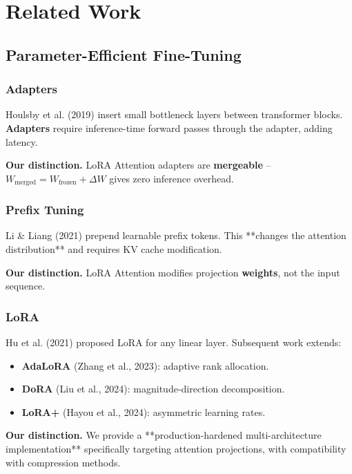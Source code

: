 \section{Related Work}

\subsection{Parameter-Efficient Fine-Tuning}

\subsubsection{Adapters}

Houlsby et al. (2019) insert small bottleneck layers between transformer 
blocks. \textbf{Adapters} require inference-time forward passes through the 
adapter, adding latency.

\textbf{Our distinction.} LoRA Attention adapters are \textbf{mergeable} -- 
$W_\text{merged} = W_\text{frozen} + \Delta W$ gives zero inference 
overhead.

\subsubsection{Prefix Tuning}

Li \& Liang (2021) prepend learnable prefix tokens. This **changes the 
attention distribution** and requires KV cache modification.

\textbf{Our distinction.} LoRA Attention modifies projection \textbf{weights}, not 
the input sequence.

\subsubsection{LoRA}

Hu et al. (2021) proposed LoRA for any linear layer. Subsequent work 
extends:
\begin{itemize}
\item \textbf{AdaLoRA} (Zhang et al., 2023): adaptive rank allocation.
\item \textbf{DoRA} (Liu et al., 2024): magnitude-direction decomposition.
\item \textbf{LoRA+} (Hayou et al., 2024): asymmetric learning rates.

\end{itemize}
\textbf{Our distinction.} We provide a **production-hardened multi-architecture 
implementation** specifically targeting attention projections, with 
compatibility with compression methods.

